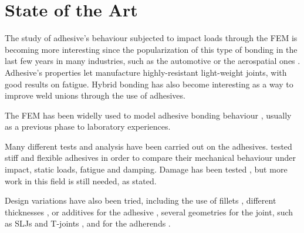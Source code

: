 \chapter{State of the Art}
\label{Chapter1}




The study of adhesive's behaviour subjected to impact loads through the \gls{FEM} is becoming more interesting since the popularization of this type of bonding in the last few years in many industries, such as the automotive or the aerospatial ones \citep{Wu2006, Greve2007, Grant2009, Scattina2011, Kadioglu2014, SernaMoreno2015}. Adhesive's properties let manufacture highly-resistant light-weight joints, with good results on fatigue. Hybrid bonding has also become interesting as a way to improve weld unions through the use of adhesives.

The \gls{FEM} has been widelly used to model adhesive bonding behaviour \citep{Sato2000, Alfano2001, Kihara2003, Vaidya2006, Wu2006, Hou2008, Grant2009, Peroni2009, Sadowski2010, Scattina2011, Sadowski2011, Liao2011, Yang2012}%
, usually as a previous phase to laboratory experiences.

Many different tests and analysis have been carried out on the adhesives. \citet{Loureiro2010} tested stiff and flexible adhesives in order to compare their mechanical behaviour under impact, static loads, fatigue and damping. Damage has been tested \citep{Goglio2008, Kadioglu2014}, but more work in this field is still needed, as \citet{Greve2007} stated.

Design variations have also been tried, including the use of fillets \citep{Grant2009, Yang2012}, different thicknesses \citep{Grant2009}, or additives for the adhesive \citep{Vaidya2006}, several geometries for the joint, such as \glspl{SLJ} and T-joints \citep{Loureiro2010}, and for the adherends \citep{Sato2000}.

